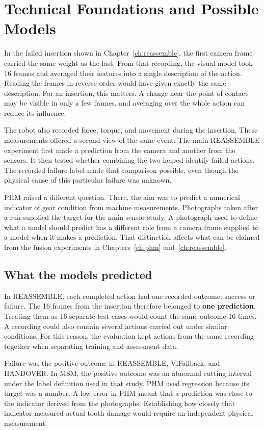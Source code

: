 \chapter{Technical Foundations and Possible Models}
\label{ch:foundations}

In the failed insertion shown in Chapter~\ref{ch:reassemble}, the first camera frame carried the same
weight as the last. From that recording, the visual
model took 16 frames and averaged their features into a single description of the
action. Reading the frames in reverse order would have given exactly the same
description. For an insertion, this matters. A change near the point of contact may be
visible in only a few frames, and averaging over the whole action can reduce its
influence.

The robot also recorded force, torque, and movement during the insertion. These
measurements offered a second view of the same event. The main REASSEMBLE experiment
first made a prediction from the camera and another from the sensors. It then tested
whether combining the two helped identify failed actions. The recorded failure label
made that comparison possible, even though the physical cause of this particular failure
was unknown.

PHM raised a different question. There, the aim was to predict a numerical indicator of
gear condition from machine measurements. Photographs taken after a run supplied the
target for the main sensor study. A photograph used to define what a model should
predict has a different role from a camera frame supplied to a model when it makes a
prediction. That distinction affects what can be claimed from the fusion experiments in
Chapters~\ref{ch:phm} and~\ref{ch:reassemble}.

\section{What the models predicted}

In REASSEMBLE, each completed action had one recorded outcome: success or failure. The
16 frames from the insertion therefore belonged to \textbf{one prediction}. Treating
them as 16 separate test cases would count the same outcome 16 times. A recording could
also contain several actions carried out under similar conditions. For this reason, the
evaluation kept actions from the same recording together when separating training and
assessment data.

Failure was the positive outcome in REASSEMBLE, ViFailback, and HANDOVER. In MSM, the
positive outcome was an abnormal cutting interval under the label definition used in
that study. PHM used regression because its target was a number. A low error in PHM
meant that a prediction was close to the indicator derived from the photographs.
Establishing how closely that indicator measured actual tooth damage would require an
independent physical measurement.

